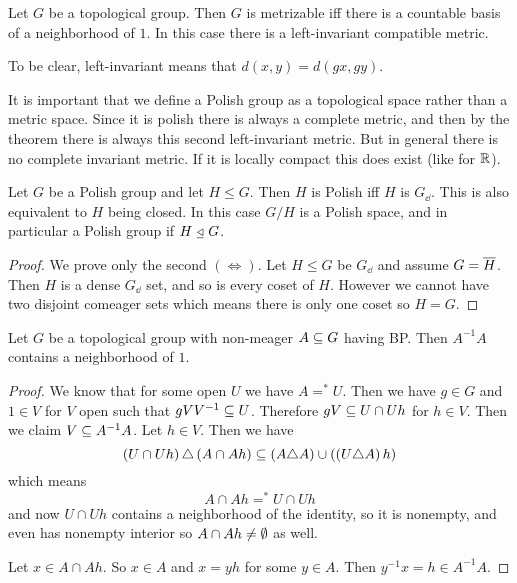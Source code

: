 \documentclass{amsart}
\begin{document}
\begin{thm}
Let $G$ be a topological group. Then $G$ is metrizable iff
there is a countable basis of a neighborhood of $1$. 
In this case there is a left-invariant compatible metric.
\end{thm}

To be clear, left-invariant means that $d\left( x,y \right) = d\left( gx, gy \right)$.

\begin{rmk}
It is important that we define a Polish group as a topological space rather than a metric
space.
Since it is polish there is always a complete metric, and then by the theorem there is always this
second left-invariant metric. But in general there is no complete invariant metric. 
If it is locally compact this does exist (like for $\mathbb{R}$).
\end{rmk}

\begin{prop}
Let $G$ be a Polish group and let $H\leq G$. Then $H$ is Polish iff $H$ is $G_\dd$. 
This is also equivalent to $H$ being closed.
In this case $G/H$ is a Polish space, and in particular a Polish group if $H\ \underline{\triangleleft}\  G$.
\end{prop}

\begin{proof}
We prove only the second $\left( \iff \right)$. 
Let $H\leq G$ be $G_\dd$ and assume $G = \overline{H}$. 
Then $H$ is a dense $G_\dd$ set, and so is every coset of $H$. 
However we cannot have two disjoint comeager sets which means
there is only one coset so $H  = G$.
\end{proof}

\begin{thm}[Pettis]
Let $G$ be a topological group with non-meager
$A\subseteq G$ having BP.
Then $A^{-1}A$ contains a neighborhood of $1$.
\end{thm}

\begin{proof}
We know that for some open $U$ we have $A =^* U$. Then we have $g\in G$
and $1\in V$ for $V$ open such that
$gVV^{-1} \subseteq U$. Therefore $gV \subseteq U\cap Uh$ for $h\in V$.
Then we claim $V\subseteq A^{-1} A$.
Let $h\in V$. Then we have
\begin{equation}
\left( U\cap Uh \right)\triangle \left( A\cap Ah \right) \subseteq \left( A\triangle A \right)\cup
\left( \left( U\triangle A \right)h \right)
\end{equation}
which means
\begin{equation}
A\cap Ah =^* U\cap Uh
\end{equation}
and now $U\cap Uh$ contains a neighborhood of the identity, so it is nonempty, and even
has nonempty interior so $A\cap Ah\neq \emptyset$ as well.

Let $x\in A\cap Ah$. So $x\in A$ and $x= yh$ for some $y\in A$. Then $y^{-1} x= h\in
A^{-1} A$. 
\end{proof}
\end{document}
